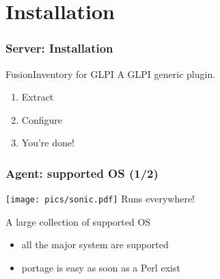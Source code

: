 \documentclass{beamer}
\begin{document}
%


\section{Installation}

\begin{frame}
    \frametitle{Server: Installation}

    \begin{block}{FusionInventory for GLPI}
        A GLPI generic plugin.
        \begin{enumerate}
            \item Extract
            \item Configure
            \item You're done!
        \end{enumerate}
    \end{block}

\end{frame}

\begin{frame}
    \frametitle{Agent: supported OS (1/2)}

    \texttt{[image: pics/sonic.pdf]}
    Runs everywhere!

    \pause

    \begin{block}{A large collection of supported OS}
        \begin{itemize}
            \item all the major system are supported
            \item portage is easy as soon as a Perl exist
        \end{itemize}
    \end{block}
\end{frame}
\end{document}

